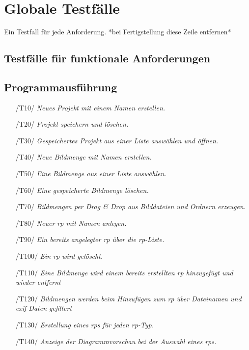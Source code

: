 \section{Globale Testfälle}

Ein Testfall für jede Anforderung. *bei Fertigstellung diese Zeile entfernen*

\subsection{Testfälle für funktionale Anforderungen}
	\begin{description}
	\subsection{Programmausführung}
	\begin{description}
\begin{itemize}
	\item[/T10/]\textit{Neues Projekt mit einem Namen erstellen.}\par
	\item[/T20/]\textit{Projekt speichern und löschen.}\par
	\item[/T30/]\textit{Gespeichertes Projekt aus einer Liste auswählen und öffnen.}\par
	\item[/T40/]\textit{Neue Bildmenge mit Namen erstellen.}\par
	\item[/T50/]\textit{Eine Bildmenge aus einer Liste auswählen.}\par
	\item[/T60/]\textit{Eine gespeicherte Bildmenge löschen.}\par
	\item[/T70/]\textit{Bildmengen per Drag \& Drop aus Bilddateien und Ordnern erzeugen.}\par
	\item[/T80/]\textit{Neuer \gls{rp} mit Namen anlegen.}\par
	\item[/T90/]\textit{Ein bereits angelegter \gls{rp} über die \gls{rp}-Liste.}\par
	\item[/T100/]\textit{Ein \gls{rp} wird gelöscht.}\par
	\item[/T110/]\textit{Eine Bildmenge wird einem bereits erstellten \gls{rp} hinzugefügt und wieder entfernt}\par
	\item[/T120/]\textit{Bildmengen werden beim Hinzufügen zum \gls{rp} über Dateinamen und \gls{exif} Daten gefiltert}\par
	\item[/T130/]\textit{Erstellung eines \gls{rp}s für jeden \gls{rp}-Typ.}\par
	\item[/T140/]\textit{Anzeige der Diagrammvorschau bei der Auswahl eines \gls{rp}s. }\par
\end{itemize}
	\end{description}

\end{description}
